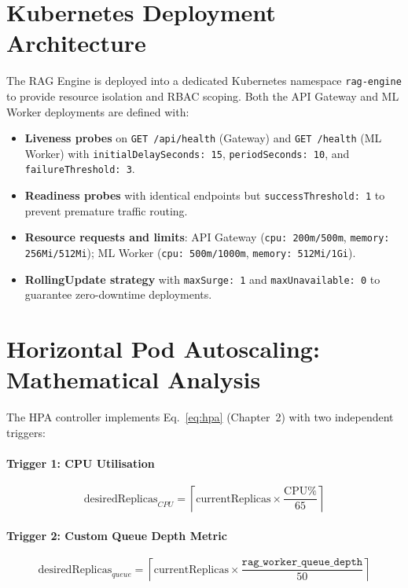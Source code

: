\documentclass[12pt,a4paper]{report}
\begin{document}
\section{Kubernetes Deployment Architecture}

The RAG Engine is deployed into a dedicated Kubernetes namespace
\texttt{rag-engine} to provide resource isolation and RBAC scoping. Both the
API Gateway and ML Worker deployments are defined with:

\begin{itemize}[leftmargin=1.5cm]
  \item \textbf{Liveness probes} on \texttt{GET /api/health} (Gateway) and
        \texttt{GET /health} (ML Worker) with \texttt{initialDelaySeconds: 15},
        \texttt{periodSeconds: 10}, and \texttt{failureThreshold: 3}.
  \item \textbf{Readiness probes} with identical endpoints but
        \texttt{successThreshold: 1} to prevent premature traffic routing.
  \item \textbf{Resource requests and limits}: API Gateway
        (\texttt{cpu: 200m/500m}, \texttt{memory: 256Mi/512Mi}); ML Worker
        (\texttt{cpu: 500m/1000m}, \texttt{memory: 512Mi/1Gi}).
  \item \textbf{RollingUpdate strategy} with \texttt{maxSurge: 1} and
        \texttt{maxUnavailable: 0} to guarantee zero-downtime deployments.
\end{itemize}

\section{Horizontal Pod Autoscaling: Mathematical Analysis}

The HPA controller implements Eq.~\eqref{eq:hpa} (Chapter~2) with two
independent triggers:

\paragraph{Trigger 1: CPU Utilisation}
\begin{equation}
  \text{desiredReplicas}_{CPU} =
  \left\lceil \text{currentReplicas} \times \frac{\text{CPU\%}}{65} \right\rceil
\end{equation}

\paragraph{Trigger 2: Custom Queue Depth Metric}
\begin{equation}
  \text{desiredReplicas}_{queue} =
  \left\lceil \text{currentReplicas} \times
  \frac{\texttt{rag\_worker\_queue\_depth}}{50} \right\rceil
\end{equation}
\end{document}
